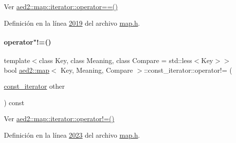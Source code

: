 Ver \hyperlink{classaed2_1_1map_1_1iterator_a34f6622845af93ca42f1be8516eeafa2_a34f6622845af93ca42f1be8516eeafa2}{aed2\+::map\+::iterator\+::operator==()} 



Definición en la línea \hyperlink{map_8h_source_l02019}{2019} del archivo \hyperlink{map_8h_source}{map.\+h}.

\mbox{\label{classaed2_1_1map_1_1const__iterator_aeb4721e5da865908c541f2a77a2ffab2_aeb4721e5da865908c541f2a77a2ffab2}} 
\paragraph{\texorpdfstring{operator"!=()}{operator!=()}}
{\footnotesize\ttfamily template$<$class Key, class Meaning, class Compare = std\+::less$<$\+Key$>$$>$ \\
bool \hyperlink{classaed2_1_1map}{aed2\+::map}$<$ Key, Meaning, Compare $>$\+::const\+\_\+iterator\+::operator!= (\begin{DoxyParamCaption}\item[{\hyperlink{classaed2_1_1map_1_1const__iterator}{const\+\_\+iterator}}]{other }\end{DoxyParamCaption}) const\hspace{0.3cm}{\ttfamily [inline]}}



Ver \hyperlink{classaed2_1_1map_1_1iterator_a748cdf8c35707d1c2e9ef8ef9d862d37_a748cdf8c35707d1c2e9ef8ef9d862d37}{aed2\+::map\+::iterator\+::operator!=()} 



Definición en la línea \hyperlink{map_8h_source_l02023}{2023} del archivo \hyperlink{map_8h_source}{map.\+h}.

\mbox{\label{classaed2_1_1map_1_1const__iterator_ab408eb7252948dd8b8df540303ab5906_ab408eb7252948dd8b8df540303ab5906}} 
